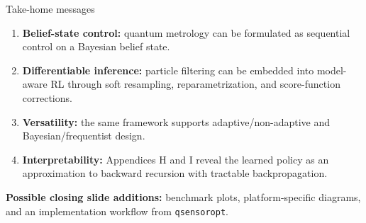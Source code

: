 \documentclass[aspectratio=169]{beamer}
\begin{document}
\begin{frame}{Take-home messages}
\begin{enumerate}
  \item \textbf{Belief-state control:} quantum metrology can be formulated as sequential control on a Bayesian belief state.
  \item \textbf{Differentiable inference:} particle filtering can be embedded into model-aware RL through soft resampling, reparametrization, and score-function corrections.
  \item \textbf{Versatility:} the same framework supports adaptive/non-adaptive and Bayesian/frequentist design.
  \item \textbf{Interpretability:} Appendices H and I reveal the learned policy as an approximation to backward recursion with tractable backpropagation.
\end{enumerate}
\vspace{0.6em}
\textbf{Possible closing slide additions:}
benchmark plots, platform-specific diagrams, and an implementation workflow from \texttt{qsensoropt}.
\end{frame}
\end{document}
